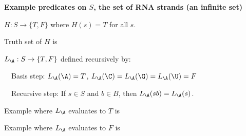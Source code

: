 
{\bf Example predicates on $S$, the set of RNA strands (an infinite set)}


$H: S \to \{T, F\}$ where $H(s) = T$ for all $s$.

Truth set of $H$ is \underline{}

\vfill

$L_{\A}: S \to \{T, F\}$  defined recursively by: 

~~Basis step: $L_{\A}(\A) = T$, $L_{\A}(\C) = L_{\A}(\G) = L_{\A}(\U) = F$

~~Recursive step: If $s \in S$ and $b \in B$, then $L_{\A}(sb) = L_{\A}(s)$.

Example where $L_{\A}$ evaluates to $T$ is \underline{\phantom{$\A\C\G$~\hspace{1in}}}

\vfill

Example where $L_{\A}$ evaluates to $F$ is \underline{\phantom{$\U\A\C\U$\hspace{1in}}}

\vfill